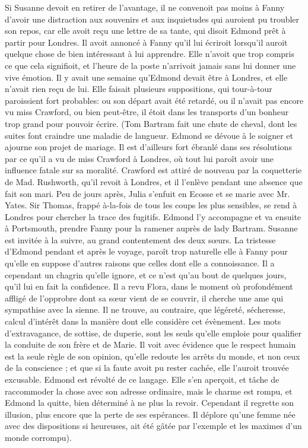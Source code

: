 Si Susanne devoit en retirer de l'avantage, il ne convenoit pas moins à Fanny d'avoir une distraction aux souvenirs et aux inquietudes qui auroient pu troubler son repos, car elle avoit reçu une lettre de sa tante, qui disoit Edmond prêt à partir pour Londres. Il avoit annoncé à Fanny qu'il lui écriroit lorsqu'il auroit quelque chose de bien intéressant à lui apprendre. Elle n'avoit que trop compris ce que cela signifioit, et l'heure de la poste n'arrivoit jamais sans lui donner une vive émotion.\setcounter{page}{402} Il y avait une semaine qu'Edmond devait être à Londres, et elle n'avait rien reçu de lui. Elle faisait plusieurs suppositions, qui tour-à-tour paroissient fort probables: ou son départ avait été retardé, ou il n'avait pas encore vu miss Crawford, ou bien peut-être, il étoit dans les transports d'un bonheur trop grand pour pouvoir écrire. (Tom Bartram fait une chute de cheval, dont les suites font craindre une maladie de langueur. Edmond se dévoue à le soigner et ajourne son projet de mariage. Il est d'ailleurs fort ébranlé dans ses résolutions par ce qu'il a vu de miss Crawford à Londres, où tout lui paroît avoir une influence fatale sur sa moralité. Crawford est attiré de nouveau par la coquetterie de Mad. Rushworth, qu'il revoit à Londres, et il l'enlève pendant une absence que fait son mari. Peu de jours après, Julia s'enfuit en Ecosse et se marie avec Mr. Yates. Sir Thomas, frappé à-la-fois de tous les coups les plus sensibles, se rend à Londres pour chercher la trace des fugitifs. Edmond l'y accompagne et va ensuite à Portsmouth, prendre Fanny pour la ramener auprès de lady Bartram. Susanne est invitée à la suivre, au grand contentement des deux sœurs. La tristesse d'Edmond pendant et après le voyage, paroît trop naturelle\setcounter{page}{403} elle à Fanny pour qu'elle en suppose d'autres raisons que celles dont elle a connoissance. Il a cependant un chagrin qu'elle ignore, et ce n'est qu'au bout de quelques jours, qu'il lui en fait la confidence. Il a revu Flora, dans le moment où profondément affligé de l'opprobre dont sa sœur vient de se couvrir, il cherche une ame qui sympathise avec la sienne. Il ne trouve, au contraire, que légéreté, sécheresse, calcul d'intérêt dans la manière dont elle considère cet évènement. Les mots d'extravagance, de sottise, de duperie, sont les seuls qu'elle emploie pour qualifier la conduite de son frère et de Marie. Il voit avec évidence que le respect humain est la seule règle de son opinion, qu'elle redoute les arrêts du monde, et non ceux de la conscience ; et que si la faute avoit pu rester cachée, elle l'auroit trouvée excusable. Edmond est révolté de ce langage. Elle s'en aperçoit, et tâche de raccommoder la chose avec son adresse ordinaire, mais le charme est rompu, et Edmond la quitte, bien déterminé à ne plus la revoir. Cependant il regrette son illusion, plus encore que la perte de ses espérances. Il déplore qu'une femme née avec des dispositions si heureuses, ait\setcounter{page}{404} été gâtée par l'exemple et les maximes d'un monde corrompu).
